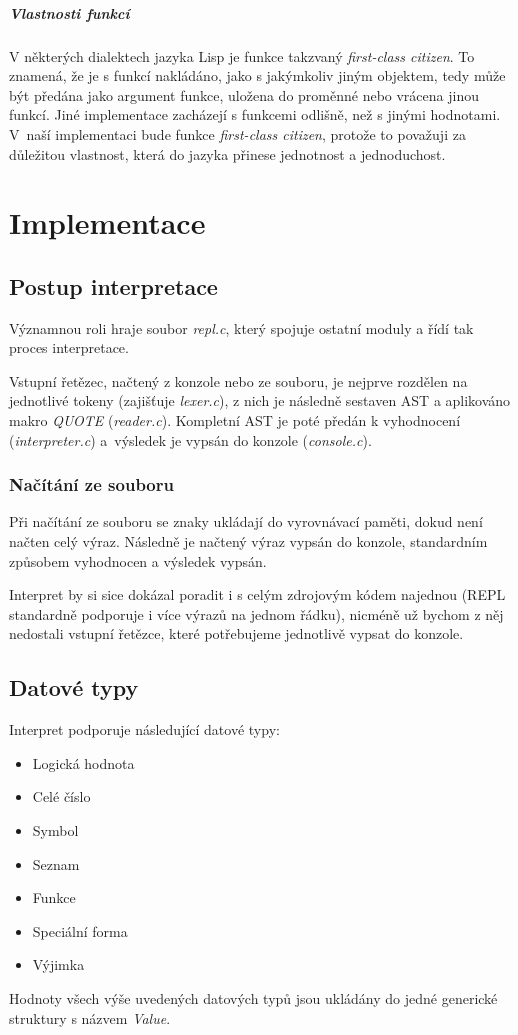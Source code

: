 \documentclass[12pt, a4paper]{report}
\begin{document}
\paragraph{Vlastnosti funkcí}
V některých dialektech jazyka Lisp je funkce takzvaný \emph{first-class citizen}. To znamená, že je s funkcí nakládáno, jako s jakýmkoliv jiným objektem, tedy může být předána jako argument funkce, uložena do proměnné nebo vrácena jinou funkcí.
Jiné implementace zacházejí s funkcemi odlišně, než s jinými hodnotami.
V~naší implementaci bude funkce \emph{first-class citizen}, protože to považuji za důležitou vlastnost, která do jazyka přinese jednotnost a jednoduchost.


\chapter{Implementace}

\section{Postup interpretace}
Významnou roli hraje soubor \emph{repl.c}, který spojuje ostatní moduly a řídí tak proces interpretace.

Vstupní řetězec, načtený z konzole nebo ze souboru, je nejprve rozdělen na jednotlivé tokeny (zajišťuje \emph{lexer.c}), z nich je následně sestaven AST a aplikováno makro \emph{QUOTE} (\emph{reader.c}). Kompletní AST je poté předán k vyhodnocení (\emph{interpreter.c}) a~výsledek je vypsán do konzole (\emph{console.c}).

\subsection{Načítání ze souboru}
Při načítání ze souboru se znaky ukládají do vyrovnávací paměti, dokud není načten celý výraz. Následně je načtený výraz vypsán do konzole, standardním způsobem vyhodnocen a výsledek vypsán.

Interpret by si sice dokázal poradit i s celým zdrojovým kódem najednou (REPL standardně podporuje i více výrazů na jednom řádku), nicméně už bychom z něj nedostali vstupní řetězce, které potřebujeme jednotlivě vypsat do konzole.

\section{Datové typy}
Interpret podporuje následující datové typy:
\begin{itemize}
	\item Logická hodnota
	\item Celé číslo
	\item Symbol
	\item Seznam
	\item Funkce
	\item Speciální forma 
	\item Výjimka
\end{itemize}
Hodnoty všech výše uvedených datových typů jsou ukládány do jedné generické struktury s názvem \emph{Value}.
\end{document}
